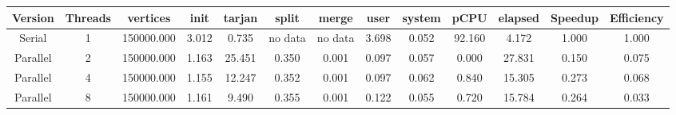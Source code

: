 \begin{tabular}{|c|c|c|c|c|c|c|c|c|c|c|c|c|}
\toprule
 Version &  Threads &   vertices &  init &  tarjan &   split &   merge &  user &  system &   pCPU &  elapsed &  Speedup &  Efficiency \\
\midrule
  Serial &        1 & 150000.000 & 3.012 &   0.735 & no data & no data & 3.698 &   0.052 & 92.160 &    4.172 &    1.000 &       1.000 \\
Parallel &        2 & 150000.000 & 1.163 &  25.451 &   0.350 &   0.001 & 0.097 &   0.057 &  0.000 &   27.831 &    0.150 &       0.075 \\
Parallel &        4 & 150000.000 & 1.155 &  12.247 &   0.352 &   0.001 & 0.097 &   0.062 &  0.840 &   15.305 &    0.273 &       0.068 \\
Parallel &        8 & 150000.000 & 1.161 &   9.490 &   0.355 &   0.001 & 0.122 &   0.055 &  0.720 &   15.784 &    0.264 &       0.033 \\
\bottomrule
\end{tabular}
